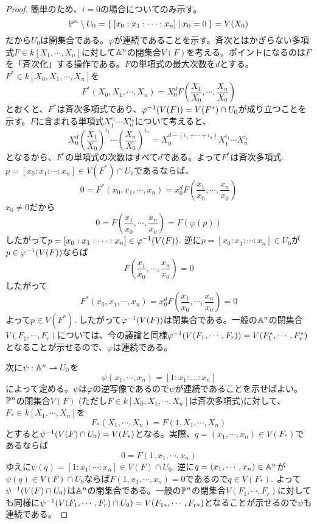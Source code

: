 \documentclass{ltjsreport}
\begin{document}
\begin{proof}
  簡単のため、$i=0$の場合についてのみ示す。
  \[
  \mathbb{P}^n\setminus U_0=\left\{\:[x_0:x_1:\cdots:x_n]\:\middle|\:x_0=0\:\right\}=V(X_0) 
  \]
  だから$U_0$は開集合である。$\varphi$が連続であることを示す。斉次とはかぎらない多項式$F\in k[X_1,\cdots,X_n]$に対して$\mathbb{A}^n$の閉集合$V(F)$を考える。ポイントになるのは$F$を「斉次化」する操作である。$F$の単項式の最大次数を$d$とする。
  $F^*\in k[X_0,X_1,\cdots,X_n]$を
  \[
  F^*(X_0,X_1,\cdots,X_n)=X_0^dF(\frac{X_1}{X_0},\cdots,\frac{X_n}{X_0})
  \]
  とおくと、$F^*$は斉次多項式であり、$\varphi^{-1}(V(F))=V(F^*)\cap U_0$が成り立つことを示す。$F$に含まれる単項式$X_1^{i_1}\cdots X_n^{i_n}$について考えると、
  \[
  X_0^d(\frac{X_1}{X_0})^{i_1}\cdots(\frac{X_n}{X_0})^{i_n}=X_0^{d-(i_1+\cdots+i_n)}X_1^{i_1}\cdots X_n^{i_n} 
  \]
  となるから、$F^*$の単項式の次数はすべて$d$である。よって$F^*$は斉次多項式. $p=[x_0:x_1:\cdots:x_n]\in V(F^*)\cap U_0$であるならば、
  \[
  0=F^*(x_0,x_1,\cdots,x_n)=x_0^dF(\frac{x_1}{x_0},\cdots,\frac{x_n}{x_0})
  \]
  $x_0\neq 0$だから
  \[
  0=F(\frac{x_1}{x_0},\cdots,\frac{x_n}{x_0})=F(\varphi(p)) 
  \]
  したがって$p=[x_0:x_1:\cdots:x_n]\in \varphi^{-1}(V(F))$. 逆に$p=[x_0:x_1:\cdots:x_n]\in U_0$が$p\in\varphi^{-1}(V(F))$ならば
  \[
  F(\frac{x_1}{x_0},\cdots,\frac{x_n}{x_0})=0
  \]
  したがって
  \[
  F^*(x_0,x_1,\cdots,x_n)=x_0^dF(\frac{x_1}{x_0},\cdots,\frac{x_n}{x_0})=0
  \]
  よって$p\in V(F^*)$. したがって$\varphi^{-1}(V(F))$は閉集合である。一般の$\mathbb{A}^n$の閉集合$V(F_1,\cdots,F_r)$については、今の議論と同様$\varphi^{-1}(V(F_1,\cdots,F_r))=V(F_1^*,\cdots,F_r^*)$となることが示せるので、$\varphi$は連続である。

  次に$\psi:\mathbb{A}^n\rightarrow U_0$を
  \[
  \psi(x_1,\cdots,x_n)=[1:x_1:\dots:x_n]  
  \]
  によって定める。$\psi$は$\varphi$の逆写像であるので$\psi$が連続であることを示せばよい。$\mathbb{P}^n$の閉集合$V(F)$ (ただし$F\in k[X_0,X_1,\cdots,X_n]$は斉次多項式)に対して、$F_*\in k[X_1,\cdots,X_n]$を
  \[
  F_*(X_1,\cdots,X_n)=F(1,X_1,\cdots,X_n)  
  \]
  とすると$\psi^{-1}(V(F)\cap U_0)=V(F_*)$となる。実際、$q=(x_1,\cdots,x_n)\in V(F_*)$であるならば
  \[
  0=F(1,x_1,\cdots,x_n)  
  \]
  ゆえに$\psi(q)=[1:x_1:\cdots:x_n]\in V(F)\cap U_0$. 逆に$q=(x_1,\cdots,x_n)\in\mathbb{A}^n$が$\psi(q)\in V(F)\cap U_0$ならば$F(1,x_1,\cdots,x_n)=0$であるので$q\in V(F_*)$. よって$\psi^{-1}(V(F)\cap U_0)$は$\mathbb{A}^n$の閉集合である。一般の$\mathbb{P}^n$の閉集合$V(F_1,\cdots,F_r)$に対しても同様に$\psi^{-1}(V(F_1,\cdots,F_r)\cap U_0)=V(F_{1*},\cdots,F_{r*})$となることが示せるので$\psi$も連続である。
\end{proof}
\end{document}
